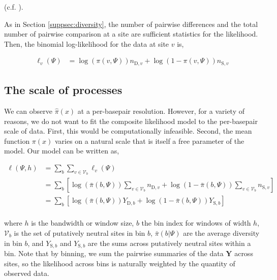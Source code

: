 \documentclass[11pt]{article}
\begin{document}
(c.f. \cite{Elyashiv2016-vt}). 

As in Section \ref{suppsec:diversity}, the number of pairwise differences and
the total number of pairwise comparison at a site are sufficient statistics for
the likelihood. Then, the binomial log-likelihood for the data at site $v$ is,

\begin{align}
  \ell_v(\Psi) &= \log(\pi(v, \Psi)) n_{\text{D},v} + \log(1-\pi(v, \Psi)) n_{\text{S},{v}}
\end{align}

\subsection{The scale of processes}

We can observe $\widehat{\pi}(x)$ at a per-basepair resolution. However, for a
variety of reasons, we do not want to fit the composite likelihood model to the
per-basepair scale of data. First, this would be computationally infeasible.
Second, the mean function $\pi(x)$ varies on a natural scale that is itself a
free parameter of the model. Our model can be written as, 

\begin{align}
  \ell(\Psi, h) &= \sum_{b} \sum_{v \in \mathcal{V}_b} \ell_v(\Psi) \\
             &= \sum_{b} \left[\log(\bar{\pi}(b, \Psi)) \sum_{v \in \mathcal{V}_b} n_{\text{D},v} + \log(1-\bar{\pi}(b, \Psi)) \sum_{v \in \mathcal{V}_b} n_{\text{S},{v}}\right] \\
             &= \sum_{b} \left[\log(\bar{\pi}(b, \Psi)) Y_{\text{D},b} + \log(1-\bar{\pi}(b, \Psi)) Y_{\text{S},{b}}\right] \\
\end{align}

where $h$ is the bandwidth or window size, $b$ the bin index for windows of
width $h$, $\mathcal{V}_b$ is the set of putatively neutral sites in bin $b$,
$\bar{\pi}(b | \Psi)$ are the average diversity in bin $b$, and
$Y_{\text{S},b}$ and $Y_{\text{S},b}$ are the sums across putatively neutral
sites within a bin. Note that by binning, we sum the pairwise summaries of the
data $\mathbf{Y}$ across sites, so the likelihood across bins is naturally
weighted by the quantity of observed data. 


\end{document}
